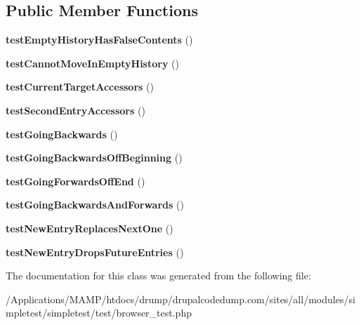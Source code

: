 \subsection*{Public Member Functions}
\begin{DoxyCompactItemize}
\item 
\hypertarget{class_test_of_history_a7296cfe6517d3af22606b8457fde7f0d}{
{\bfseries testEmptyHistoryHasFalseContents} ()}
\label{class_test_of_history_a7296cfe6517d3af22606b8457fde7f0d}

\item 
\hypertarget{class_test_of_history_a230912d1be249b9fd7753ae53178f6cb}{
{\bfseries testCannotMoveInEmptyHistory} ()}
\label{class_test_of_history_a230912d1be249b9fd7753ae53178f6cb}

\item 
\hypertarget{class_test_of_history_ad1a6740f465066c6910cd3d004167f5f}{
{\bfseries testCurrentTargetAccessors} ()}
\label{class_test_of_history_ad1a6740f465066c6910cd3d004167f5f}

\item 
\hypertarget{class_test_of_history_a2a7574de000d311e246edebd017f0580}{
{\bfseries testSecondEntryAccessors} ()}
\label{class_test_of_history_a2a7574de000d311e246edebd017f0580}

\item 
\hypertarget{class_test_of_history_afa0a648421496f31b4089f12076cf6b5}{
{\bfseries testGoingBackwards} ()}
\label{class_test_of_history_afa0a648421496f31b4089f12076cf6b5}

\item 
\hypertarget{class_test_of_history_a0c380fea075517484c507c773af197a3}{
{\bfseries testGoingBackwardsOffBeginning} ()}
\label{class_test_of_history_a0c380fea075517484c507c773af197a3}

\item 
\hypertarget{class_test_of_history_adfc8862ea482836a8921f442e648ccda}{
{\bfseries testGoingForwardsOffEnd} ()}
\label{class_test_of_history_adfc8862ea482836a8921f442e648ccda}

\item 
\hypertarget{class_test_of_history_a0c6250af6f5c067f622f62081b8624d0}{
{\bfseries testGoingBackwardsAndForwards} ()}
\label{class_test_of_history_a0c6250af6f5c067f622f62081b8624d0}

\item 
\hypertarget{class_test_of_history_ad3673c095d7e9051f461a720fa7381c3}{
{\bfseries testNewEntryReplacesNextOne} ()}
\label{class_test_of_history_ad3673c095d7e9051f461a720fa7381c3}

\item 
\hypertarget{class_test_of_history_a34eaec6d3fa475d416f10f7ca4ff6580}{
{\bfseries testNewEntryDropsFutureEntries} ()}
\label{class_test_of_history_a34eaec6d3fa475d416f10f7ca4ff6580}

\end{DoxyCompactItemize}


The documentation for this class was generated from the following file:\begin{DoxyCompactItemize}
\item 
/Applications/MAMP/htdocs/drump/drupalcodedump.com/sites/all/modules/simpletest/simpletest/test/browser\_\-test.php\end{DoxyCompactItemize}
